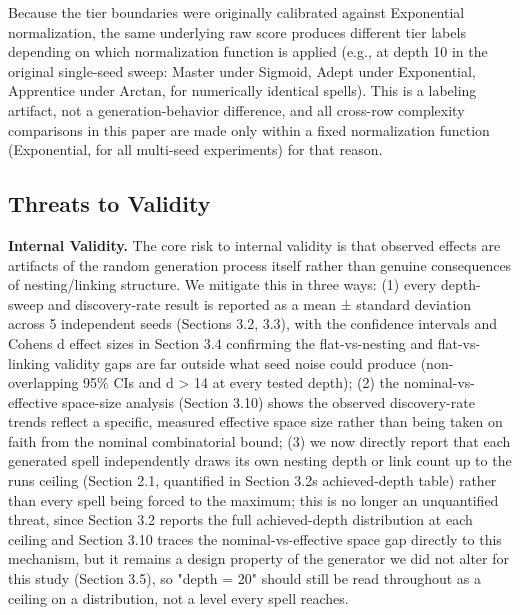 \documentclass[
  10pt,
  twocolumn]{article}
\begin{document}
Because the tier boundaries were originally calibrated against
Exponential normalization, the same underlying raw score produces
different tier labels depending on which normalization function is
applied (e.g., at depth 10 in the original single-seed sweep: Master
under Sigmoid, Adept under Exponential, Apprentice under Arctan, for
numerically identical spells). This is a labeling artifact, not a
generation-behavior difference, and all cross-row complexity comparisons
in this paper are made only within a fixed normalization function
(Exponential, for all multi-seed experiments) for that reason.

\subsection{Threats to Validity}\label{threats-to-validity}

\textbf{Internal Validity.} The core risk to internal validity is that
observed effects are artifacts of the random generation process itself
rather than genuine consequences of nesting/linking structure. We
mitigate this in three ways: (1) every depth-sweep and discovery-rate
result is reported as a mean ± standard deviation across 5 independent
seeds (Sections 3.2, 3.3), with the confidence intervals and
Cohen\textquotesingle s d effect sizes in Section 3.4 confirming the
flat-vs-nesting and flat-vs-linking validity gaps are far outside what
seed noise could produce (non-overlapping 95\% CIs and
\textbar d\textbar{} \textgreater{} 14 at every tested depth); (2) the
nominal-vs-effective space-size analysis (Section 3.10) shows the
observed discovery-rate trends reflect a specific, measured effective
space size rather than being taken on faith from the nominal
combinatorial bound; (3) we now directly report that each generated
spell independently draws its own nesting depth or link count up to the
run\textquotesingle s ceiling (Section 2.1, quantified in Section
3.2\textquotesingle s achieved-depth table) rather than every spell
being forced to the maximum; this is no longer an unquantified threat,
since Section 3.2 reports the full achieved-depth distribution at each
ceiling and Section 3.10 traces the nominal-vs-effective space gap
directly to this mechanism, but it remains a design property of the
generator we did not alter for this study (Section 3.5), so "depth = 20"
should still be read throughout as a ceiling on a distribution, not a
level every spell reaches.
\end{document}
